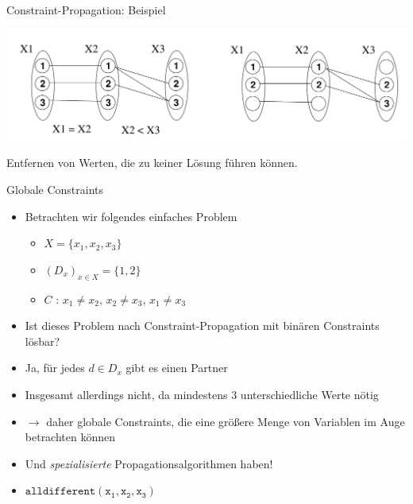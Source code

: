 \documentclass[10pt,xcolor={dvipsnames},fleqn]{beamer}
\begin{document}
\begin{frame}{Constraint-Propagation: Beispiel}
\begin{center}
\includegraphics[width=\textwidth]{img/constprop.png}
\end{center}
Entfernen von Werten, die zu keiner Lösung führen können. 
\end{frame}


\begin{frame}{Globale Constraints}
\begin{itemize}
\item Betrachten wir folgendes einfaches Problem
\begin{itemize}
\item $X = \{x_1, x_2, x_3 \}$
\item $(D_x)_{x \in X} = \{1,2\}$
\item $C$ : $x_1 \neq x_2$, $x_2 \neq x_3$, $x_1 \neq x_3$
\end{itemize}
\item Ist dieses Problem nach Constraint-Propagation mit binären Constraints \alert{lösbar}? \pause
\item Ja, für jedes $d \in D_x$ gibt es einen Partner \pause 
\item Insgesamt allerdings nicht, da mindestens 3 unterschiedliche Werte nötig
\item $\rightarrow$ daher globale Constraints, die eine größere Menge von Variablen im Auge betrachten können
\item Und \emph{spezialisierte} Propagationsalgorithmen haben!
\item $\mathtt{alldifferent(x_1, x_2, x_3)}$
\end{itemize}
\end{frame}
\end{document}
